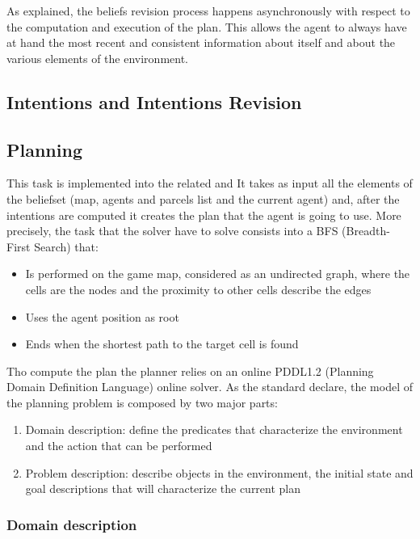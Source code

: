 \documentclass[a4paper, 11pt]{article}
\begin{document}
As explained, the beliefs revision process happens asynchronously with respect to the computation and execution of the plan. This allows the agent to always have at hand the most recent and consistent information about itself and about the various elements of the environment.
\subsection{Intentions and Intentions Revision}



\subsection{Planning}

This task is implemented into the related and It takes as input all the elements of the beliefset (map, agents and parcels list and the current agent) and, after the intentions are computed it creates the plan that the agent is going to use.
More precisely, the task that the solver have to solve consists into a BFS (Breadth-First Search) that:
\begin{itemize}
    \item Is performed on the game map, considered as an undirected graph, where the cells are the nodes and the proximity to other cells describe the edges
    \item Uses the agent position as root
    \item Ends when the shortest path to the target cell is found\\
\end{itemize}

Tho compute the plan the planner relies on an online PDDL1.2 (Planning Domain Definition Language) online solver. As the standard declare, the model of the planning problem is composed by two major parts:
\begin{enumerate}
    \item Domain description: define the predicates that characterize the environment and the action that can be performed
    \item Problem description: describe objects in the environment, the initial state and goal descriptions that will characterize the current plan\\
\end{enumerate}

\subsubsection{Domain description}
\end{document}
